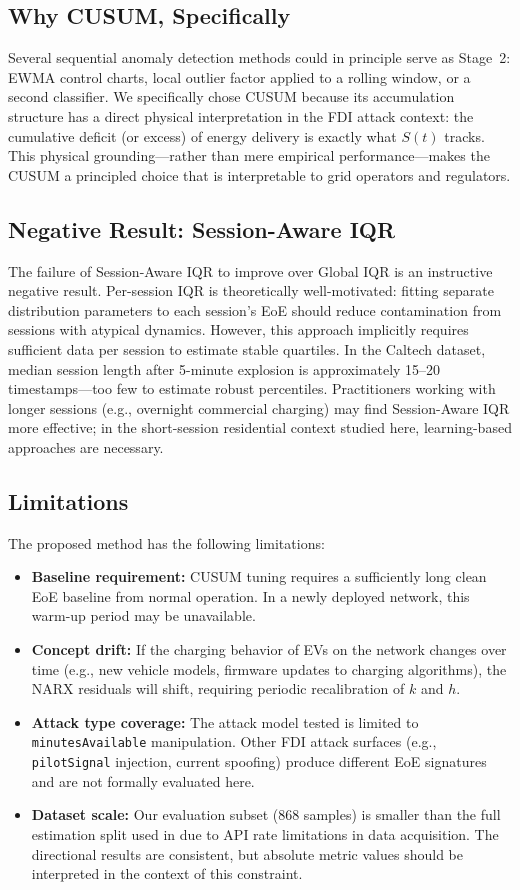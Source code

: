 \documentclass[journal]{IEEEtran}
\begin{document}
\subsection{Why CUSUM, Specifically}
Several sequential anomaly detection methods could in principle serve
as Stage~2: EWMA control charts, local outlier factor applied to a
rolling window, or a second classifier. We specifically chose CUSUM
because its accumulation structure has a direct physical interpretation
in the FDI attack context: the cumulative deficit (or excess) of energy
delivery is exactly what $S(t)$ tracks. This physical grounding---rather
than mere empirical performance---makes the CUSUM a principled choice
that is interpretable to grid operators and regulators.

\subsection{Negative Result: Session-Aware IQR}
The failure of Session-Aware IQR to improve over Global IQR is an
instructive negative result. Per-session IQR is theoretically well-motivated:
fitting separate distribution parameters to each session's EoE should
reduce contamination from sessions with atypical dynamics. However,
this approach implicitly requires sufficient data per session to
estimate stable quartiles. In the Caltech dataset, median session
length after 5-minute explosion is approximately 15--20 timestamps---too
few to estimate robust percentiles. Practitioners working with longer
sessions (e.g., overnight commercial charging) may find Session-Aware
IQR more effective; in the short-session residential context studied
here, learning-based approaches are necessary.

\subsection{Limitations}
The proposed method has the following limitations:
\begin{itemize}
\item \textbf{Baseline requirement:} CUSUM tuning requires a sufficiently
long clean EoE baseline from normal operation. In a newly deployed
network, this warm-up period may be unavailable.
\item \textbf{Concept drift:} If the charging behavior of EVs on the
network changes over time (e.g., new vehicle models, firmware updates
to charging algorithms), the NARX residuals will shift, requiring
periodic recalibration of $k$ and $h$.
\item \textbf{Attack type coverage:} The attack model tested is limited
to \texttt{minutesAvailable} manipulation. Other FDI attack surfaces
(e.g., \texttt{pilotSignal} injection, current spoofing) produce
different EoE signatures and are not formally evaluated here.
\item \textbf{Dataset scale:} Our evaluation subset (868 samples) is
smaller than the full estimation split used in \cite{basumatary2025}
due to API rate limitations in data acquisition. The directional
results are consistent, but absolute metric values should be
interpreted in the context of this constraint.
\end{itemize}
\end{document}
